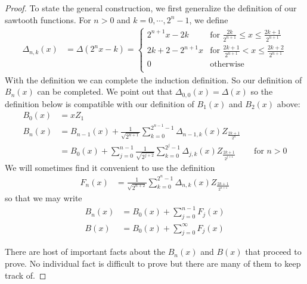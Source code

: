 \begin{proof}
To state the general construction, we first generalize the definition
of our sawtooth functions.  For $n > 0$ and $k=0, \cdots, 2^n -1$, we
define 
\begin{align*}
\Delta_{n,k} (x) &= \Delta(2^nx- k) = \begin{cases}
2^{n+1}x -2k & \text{for $\frac{2k}{2^{n+1}} \leq x \leq \frac{2k+1}{2^{n+1}}$} \\
2k + 2 - 2^{n+1}x & \text{for $\frac{2k+1}{2^{n+1}} < x \leq \frac{2k+2}{2^{n+1}}$} \\
0 & \text{otherwise} \\
\end{cases}
\end{align*}
With the definition we can complete the induction definition.  So our definition
of $B_n(x)$ can be completed.  We point out that $\Delta_{0,0}(x) =
\Delta(x)$ so the definition below is compatible with our definition
of $B_1(x)$ and $B_2(x)$ above:
\begin{align*} 
B_0(x) &= x Z_1 \\
B_n(x) &= B_{n-1}(x) + \frac{1}{\sqrt{2^{n+1}}} \sum_{k=0}^{2^{n-1} -1}
\Delta_{n-1,k}(x) Z_{\frac{2k+1}{2^{n}}} \\
&=B_0(x) + \sum_{j=0}^{n-1}\frac{1}{\sqrt{2^{j+2}}} \sum_{k=0}^{2^j -1}
\Delta_{j,k}(x) Z_{\frac{2k+1}{2^{j+1}}} & & \text{for $n > 0$} 
\end{align*}
We will sometimes find it convenient to use the definition
\begin{align*}
F_n(x) &= \frac{1}{\sqrt{2^{n+2}}} \sum_{k=0}^{2^n -1}
\Delta_{n,k}(x) Z_{\frac{2k+1}{2^{n+1}}} 
\end{align*}
so that we may write 
\begin{align*}
B_n(x) &= B_0(x) + \sum_{j=0}^{n-1} F_j(x) \\
B(x) &= B_0(x) + \sum_{j=0}^\infty F_j(x)
\end{align*}

There are host of important facts about the $B_n(x)$ and $B(x)$ that
proceed to prove.  No individual fact is difficult to prove but there
are many of them to keep track of.


\end{proof}
